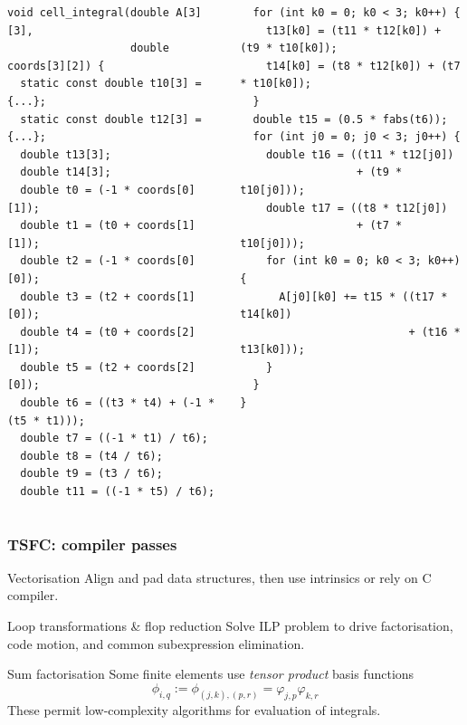 \documentclass[presentation]{beamer}
\begin{document}
\begin{frame}[fragile]
\begin{overlayarea}{\textwidth}{0.8\textheight}
\begin{onlyenv}
\begin{columns}
      \begin{column}{0.5\textwidth}
\begin{verbatim}
void cell_integral(double A[3][3],
                   double coords[3][2]) {
  static const double t10[3] = {...};
  static const double t12[3] = {...};
  double t13[3];
  double t14[3];
  double t0 = (-1 * coords[0][1]);
  double t1 = (t0 + coords[1][1]);
  double t2 = (-1 * coords[0][0]);
  double t3 = (t2 + coords[1][0]);
  double t4 = (t0 + coords[2][1]);
  double t5 = (t2 + coords[2][0]);
  double t6 = ((t3 * t4) + (-1 * (t5 * t1)));
  double t7 = ((-1 * t1) / t6);
  double t8 = (t4 / t6);
  double t9 = (t3 / t6);
  double t11 = ((-1 * t5) / t6);
\end{verbatim}
      \end{column}
      \begin{column}{0.5\textwidth}
\begin{verbatim}
  for (int k0 = 0; k0 < 3; k0++) {
    t13[k0] = (t11 * t12[k0]) + (t9 * t10[k0]);
    t14[k0] = (t8 * t12[k0]) + (t7 * t10[k0]);
  }
  double t15 = (0.5 * fabs(t6));
  for (int j0 = 0; j0 < 3; j0++) {
    double t16 = ((t11 * t12[j0])
                  + (t9 * t10[j0]));
    double t17 = ((t8 * t12[j0])
                  + (t7 * t10[j0]));
    for (int k0 = 0; k0 < 3; k0++) {
      A[j0][k0] += t15 * ((t17 * t14[k0])
                          + (t16 * t13[k0]));
    }
  }
}
\end{verbatim}
      \end{column}
    \end{columns}
  \end{onlyenv}
  \end{overlayarea}
\end{frame}

\begin{frame}
  \frametitle{TSFC: compiler passes}
  \begin{block}{Vectorisation}
    Align and pad data structures, then use intrinsics or rely on C
    compiler.
  \end{block}

  \begin{block}{Loop transformations \& flop reduction}
    Solve ILP problem to drive factorisation, code motion, and common
    subexpression elimination.
  \end{block}

  \begin{block}{Sum factorisation}
    Some finite elements use \emph{tensor product} basis functions
    \begin{equation*}
      \phi_{i,q} := \phi_{(j,k),(p,r)} = \varphi_{j,p}\varphi_{k,r}
    \end{equation*}
    These permit low-complexity algorithms for evaluation of integrals.
  \end{block}
\end{frame}
\end{document}
